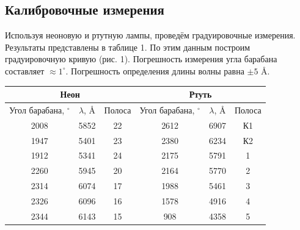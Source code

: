 \documentclass[a4paper]{article}
\begin{document}
\subsection{Калибровочные измерения}
Используя неоновую и ртутную лампы, проведём градуировочные измерения. Результаты представлены в таблице 1. По этим данным построим градуировочную кривую (рис. 1). Погрешность измерения угла барабана составляет $\approx 1^\circ$. Погрешность определения длины волны равна $\pm 5$ \r{A}.

\begin{table}[!ht]
    \centering
    \begin{tabular}{|ccc|ccc|}
    \hline
    \multicolumn{3}{|c|}{\cellcolor[HTML]{CBCEFB}Неон}                                        & \multicolumn{3}{c|}{\cellcolor[HTML]{CBCEFB}Ртуть}                                       \\ \hline
    \multicolumn{1}{|c|}{Угол барабана, $^\circ$} & \multicolumn{1}{c|}{$\lambda$, \r{A}} & Полоса & \multicolumn{1}{c|}{Угол барабана, $^\circ$} & \multicolumn{1}{c|}{$\lambda$, \r{A}} & Полоса \\ \hline
    \multicolumn{1}{|c|}{2008}                   & \multicolumn{1}{c|}{5852}         & 22     & \multicolumn{1}{c|}{2612}                   & \multicolumn{1}{c|}{6907}         & К1     \\ \hline
    \multicolumn{1}{|c|}{1947}                   & \multicolumn{1}{c|}{5401}         & 23     & \multicolumn{1}{c|}{2380}                   & \multicolumn{1}{c|}{6234}         & К2     \\ \hline
    \multicolumn{1}{|c|}{1912}                   & \multicolumn{1}{c|}{5341}         & 24     & \multicolumn{1}{c|}{2175}                   & \multicolumn{1}{c|}{5791}         & 1      \\ \hline
    \multicolumn{1}{|c|}{2260}                   & \multicolumn{1}{c|}{5945}         & 20     & \multicolumn{1}{c|}{2164}                   & \multicolumn{1}{c|}{5770}         & 2      \\ \hline
    \multicolumn{1}{|c|}{2314}                   & \multicolumn{1}{c|}{6074}         & 17     & \multicolumn{1}{c|}{1988}                   & \multicolumn{1}{c|}{5461}         & 3      \\ \hline
    \multicolumn{1}{|c|}{2326}                   & \multicolumn{1}{c|}{6096}         & 16     & \multicolumn{1}{c|}{1578}                   & \multicolumn{1}{c|}{4916}         & 4      \\ \hline
    \multicolumn{1}{|c|}{2344}                   & \multicolumn{1}{c|}{6143}         & 15     & \multicolumn{1}{c|}{908}                    & \multicolumn{1}{c|}{4358}         & 5      \\ \hline

\end{tabular}
\end{table}
\end{document}
